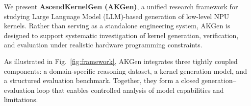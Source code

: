 We present \textbf{AscendKernelGen (AKGen)}, a unified research framework for studying Large Language Model (LLM)-based generation of low-level NPU kernels. Rather than serving as a standalone engineering system, AKGen is designed to support systematic investigation of kernel generation, verification, and evaluation under realistic hardware programming constraints.

As illustrated in Fig.~\ref{fig:framework}, AKGen integrates three tightly coupled components: a domain-specific reasoning dataset, a kernel generation model, and a structured evaluation benchmark. Together, they form a closed generation--evaluation loop that enables controlled analysis of model capabilities and limitations.

